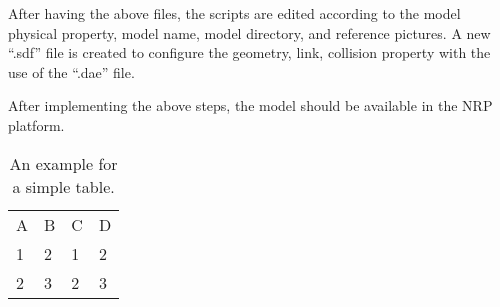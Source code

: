 After having the above files, the scripts are edited according to the model physical property, model name, model directory, and reference pictures. A new ``.sdf'' file is created to configure the geometry, link, collision property with the use of the ``.dae'' file. 

After implementing the above steps, the model should be available in the NRP platform.





\begin{table}[htpb]
	\caption[Example table]{An example for a simple table.}\label{tab:sampleA}
	\centering
	\begin{tabular}{l l l l}
		A & B & C & D \\
		\cline{1-4}	
		1 & 2 & 1 & 2 \\
		2 & 3 & 2 & 3 \\
	\end{tabular}
\end{table}



